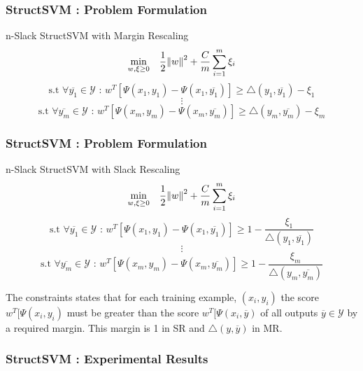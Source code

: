 \documentclass[a4paper,compress,svgnames]{beamer}
\begin{document}
\begin{frame}
\frametitle{StructSVM : Problem Formulation}
\begin{block}{n-Slack StructSVM with Margin Rescaling}
\[\underset{w, \xi \geq 0}{\min} \quad \frac{1}{2} \norm{w}^2 + \frac{C}{m} \sum_{i=1}^m \xi_i \]
\[ \textrm{s.t } \forall \overline{y_1} \in \mathcal{Y} \textrm{  :  } w^T[\Psi(x_1, y_1) - \Psi(x_1, \overline{y_1})] \geq \bigtriangleup(y_1, \overline{y_1}) - \xi_1 \]
\[ \vdots \]
\[ \textrm{s.t } \forall \overline{y_m} \in \mathcal{Y} \textrm{  :  } w^T[\Psi(x_m, y_m) - \Psi(x_m, \overline{y_m})] \geq \bigtriangleup(y_m, \overline{y_m}) - \xi_m \]
\end{block}

\end{frame}

\begin{frame}
\frametitle{StructSVM : Problem Formulation}
\begin{block}{n-Slack StructSVM with Slack Rescaling}
\[\underset{w, \xi \geq 0}{\min} \quad \frac{1}{2} \norm{w}^2 + \frac{C}{m} \sum_{i=1}^m \xi_i \]
\[ \textrm{s.t } \forall \overline{y_1} \in \mathcal{Y} \textrm{  :  } w^T[\Psi(x_1, y_1) - \Psi(x_1, \overline{y_1})] \geq 1 - \frac{\xi_1}{\bigtriangleup(y_1, \overline{y_1})} \]
\[ \vdots \]
\[ \textrm{s.t } \forall \overline{y_m} \in \mathcal{Y} \textrm{  :  } w^T[\Psi(x_m, y_m) - \Psi(x_m, \overline{y_m})] \geq 1 - \frac{\xi_m}{\bigtriangleup(y_m, \overline{y_m})} \]
\end{block}
The constraints states that for each training example, $(x_i, y_i)$ the score $w^T[\Psi(x_i, y_i)$ must be greater than the score $w^T[\Psi(x_i, \overline{y})$ of all outputs $\overline{y} \in \mathcal{Y}$ by a required margin. This margin is 1 in SR and $\bigtriangleup(y, \overline{y})$ in MR.
\end{frame}

\begin{frame}
\frametitle{StructSVM : Experimental Results}
\renewcommand{\arraystretch}{1.2}
\begin{table}
\centering
{}
\end{table}
\renewcommand{\arraystretch}{1}
\end{frame}
\end{document}
